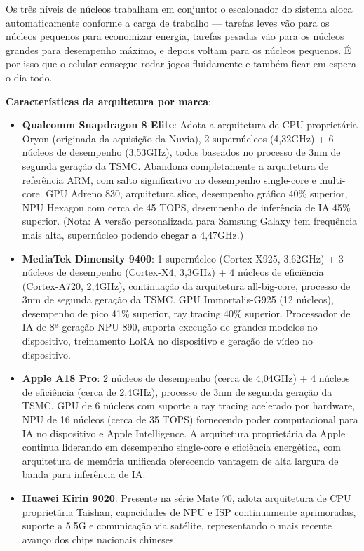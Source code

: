 Os três níveis de núcleos trabalham em conjunto: o escalonador do sistema aloca automaticamente conforme a carga de trabalho — tarefas leves vão para os núcleos pequenos para economizar energia, tarefas pesadas vão para os núcleos grandes para desempenho máximo, e depois voltam para os núcleos pequenos. É por isso que o celular consegue rodar jogos fluidamente e também ficar em espera o dia todo.

\textbf{Características da arquitetura por marca}:

\begin{itemize}
  \item \textbf{Qualcomm Snapdragon 8 Elite}: Adota a arquitetura de CPU proprietária Oryon (originada da aquisição da Nuvia), 2 supernúcleos (4,32GHz) + 6 núcleos de desempenho (3,53GHz), todos baseados no processo de 3nm de segunda geração da TSMC. Abandona completamente a arquitetura de referência ARM, com salto significativo no desempenho single-core e multi-core. GPU Adreno 830, arquitetura slice, desempenho gráfico 40\% superior, NPU Hexagon com cerca de 45 TOPS, desempenho de inferência de IA 45\% superior. (Nota: A versão personalizada para Samsung Galaxy tem frequência mais alta, supernúcleo podendo chegar a 4,47GHz.)
  \item \textbf{MediaTek Dimensity 9400}: 1 supernúcleo (Cortex-X925, 3,62GHz) + 3 núcleos de desempenho (Cortex-X4, 3,3GHz) + 4 núcleos de eficiência (Cortex-A720, 2,4GHz), continuação da arquitetura all-big-core, processo de 3nm de segunda geração da TSMC. GPU Immortalis-G925 (12 núcleos), desempenho de pico 41\% superior, ray tracing 40\% superior. Processador de IA de 8ª geração NPU 890, suporta execução de grandes modelos no dispositivo, treinamento LoRA no dispositivo e geração de vídeo no dispositivo.
  \item \textbf{Apple A18 Pro}: 2 núcleos de desempenho (cerca de 4,04GHz) + 4 núcleos de eficiência (cerca de 2,4GHz), processo de 3nm de segunda geração da TSMC. GPU de 6 núcleos com suporte a ray tracing acelerado por hardware, NPU de 16 núcleos (cerca de 35 TOPS) fornecendo poder computacional para IA no dispositivo e Apple Intelligence. A arquitetura proprietária da Apple continua liderando em desempenho single-core e eficiência energética, com arquitetura de memória unificada oferecendo vantagem de alta largura de banda para inferência de IA.
  \item \textbf{Huawei Kirin 9020}: Presente na série Mate 70, adota arquitetura de CPU proprietária Taishan, capacidades de NPU e ISP continuamente aprimoradas, suporte a 5.5G e comunicação via satélite, representando o mais recente avanço dos chips nacionais chineses.
\end{itemize}

